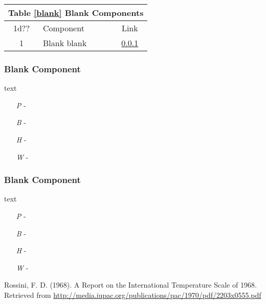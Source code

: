 \documentclass[a4paper]{article}
\begin{document}
\vspace{0.5cm} \hspace{0.25\linewidth}
\begin{tabular}{@{} | c | l | c | @{}}
\toprule
\multicolumn{3}{|l|}{Table \ref{blank} Blank Components} \\
\toprule
1d?? & Component & Link \\
\midrule
1 & Blank blank & \ref{blank_blank} \\
\bottomrule
\end{tabular}

\hspace{-18pt} \subsubsection{Blank Component} \label{blank_blank} \vspace{-0.2cm}
text
\begin{enumerate}
\item [\textit{P}] - 
\item [\textit{B}] - 
\item [\textit{H}] - 
\item [\textit{W}] - 
\end{enumerate}

\vspace{-0.5cm} \hspace{-18pt} \subsubsection{Blank Component} \label{blank_blank2} \vspace{-0.2cm}
text
\begin{enumerate}
\item [\textit{P}] - 
\item [\textit{B}] - 
\item [\textit{H}] - 
\item [\textit{W}] - 
\end{enumerate}


\newpage
\begin{thebibliography}{0}
Rossini, F. D. (1968). A Report on the International Temperature Scale of 1968. Retrieved from \url{http://media.iupac.org/publications/pac/1970/pdf/2203x0555.pdf}
\end{thebibliography}
\end{document}
